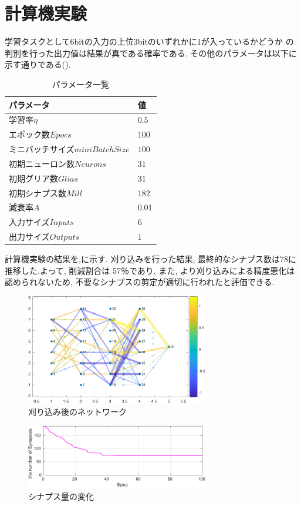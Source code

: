 \documentclass[a4paper,10.5pt,twocolumn]{jsarticle}
\begin{document}
\section{計算機実験}
学習タスクとして6bitの入力の上位3bitのいずれかに1が入っているかどうか
の判別を行った出力値は結果が真である確率である. 
その他のパラメータは以下に示す通りである().
\begin{table}[H]
  \caption{パラメータ一覧}
  \label{tab:param}
  \centering
   \begin{tabular}{ll}
    \toprule
      パラメータ&値\\\midrule\midrule
      学習率$\eta$&$0.5$\\
      エポック数$Epocs$&$100$\\
      ミニバッチサイズ$miniBatchSize$&$100$\\
      初期ニューロン数$Neurons$&$31$\\
      初期グリア数$Glias$&$31$\\
      初期シナプス数$Mill$&$182$\\
      減衰率$A$&0.01\\
      入力サイズ$Inputs$&$6$\\
      出力サイズ$Outputs$&$1$\\
    \bottomrule
   \end{tabular}
 \end{table}
計算機実験の結果を,に示す.
刈り込みを行った結果, 最終的なシナプス数は78に推移した.よって, 削減割合は
57％であり, また, より刈り込みによる精度悪化は認められないため, 
不要なシナプスの剪定が適切に行われたと評価できる.
\begin{figure}[H]
  \centering
  \includegraphics[width=8cm]{Graph-crop.pdf} 
  \caption{刈り込み後のネットワーク}
  \label{fig:Graph}
\end{figure}
\vspace{-2zh}
\begin{figure}[H]
  \centering
  \includegraphics[width=8cm]{SynapseNum-crop.pdf} 
  \caption{シナプス量の変化}
  \label{fig:SynapseNum}
\end{figure}
\end{document}
